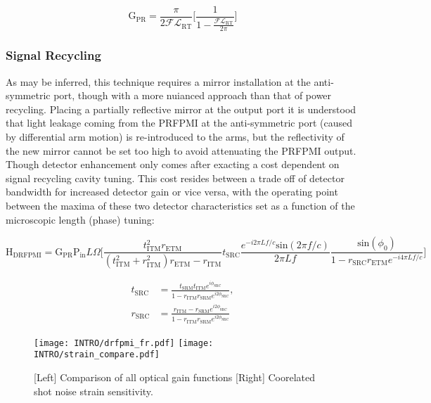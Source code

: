 \begin{equation}
	\mathrm{G_{PR}} = \frac{\pi}{2 \mathscr{F} \mathscr{L}_\mathrm{RT}} \bigg[ \frac{1}{1- \frac{ \mathscr{F} \mathscr{L}_\mathrm{RT}}{ 2 \pi}} \bigg]
\end{equation}

\subsubsection{Signal Recycling}
As may be inferred, this technique requires a mirror installation at the anti-symmetric port, though with a more nuianced approach than that of power recycling. Placing a partially reflective mirror at the output port it is understood that light leakage coming from the PRFPMI at the anti-symmetric port (caused by differential arm motion) is re-introduced to the arms, but the reflectivity of the new mirror cannot be set too high to avoid attenuating the PRFPMI output. Though detector enhancement only comes after exacting a cost dependent on signal recycling cavity tuning. This cost resides between a trade off of detector bandwidth for increased detector gain or vice versa, with the operating point between the maxima of these two detector characteristics set as a function of the microscopic length (phase) tuning:

\begin{equation}
	\mathrm{H}_\mathrm{DRFPMI} = \mathrm{G}_\mathrm{PR} \mathrm{P}_\mathrm{in} L \Omega \bigg[ \frac{ t_\mathrm{ITM}^2 r_\mathrm{ETM}}{(t_\mathrm{ITM}^2 + r_\mathrm{ITM}^2)r_\mathrm{ETM} - r_\mathrm{ITM}}  t_\mathrm{SRC} \frac{e^{-i 2 \pi L f / c} \mathrm{sin}( 2 \pi f / c)}{ 2 \pi L f } \frac{\mathrm{sin}(\phi_0)}{1- r_\mathrm{SRC}r_\mathrm{ETM} e^{-i 4 \pi L f / c}} \bigg]
\end{equation}

\begin{align}
	t_\mathrm{SRC} & = \frac{t_\mathrm{SRM} t_\mathrm{ITM} e^{i\phi_\mathrm{SRC}}}{1-r_\mathrm{ITM} r_\mathrm{SRM} e^{i2\phi_\mathrm{SRC}}}, \\
	r_\mathrm{SRC} & = \frac{r_\mathrm{ITM} - r_\mathrm{SRM} e^{i2\phi_\mathrm{SRC}}}{1-r_\mathrm{ITM} r_\mathrm{SRM} e^{i2\phi_\mathrm{SRC}}} 
\end{align}

\begin{figure}[h!]
  \begin{subcaptiongroup}
	  \texttt{[image: INTRO/drfpmi\_fr.pdf]}
 	  \texttt{[image: INTRO/strain\_compare.pdf]}
  \end{subcaptiongroup}
  \hfill
  \caption{[Left] Comparison of all optical gain functions [Right] Coorelated shot noise strain sensitivity.}
  \label{fig:drfpmi_gain_and_strain}
\end{figure}

